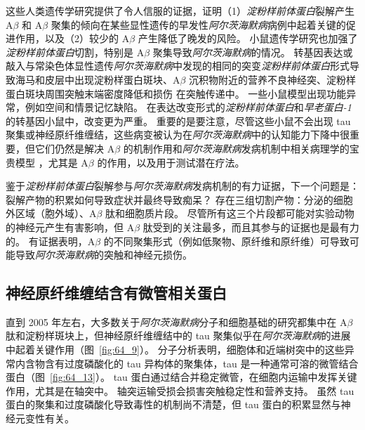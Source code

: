 这些人类遗传学研究提供了令人信服的证据，证明（1）\textit{淀粉样前体蛋白}裂解产生 A$\beta$ 和 A$\beta$ 聚集的倾向在某些显性遗传的早发性\textit{阿尔茨海默病}病例中起着关键的促进作用，以及（2）较少的 A$\beta$ 产生降低了晚发的风险。
小鼠遗传学研究也加强了\textit{淀粉样前体蛋白}切割，特别是 A$\beta$ 聚集导致\textit{阿尔茨海默病}的情况。
转基因表达或敲入与常染色体显性遗传\textit{阿尔茨海默病}中发现的相同的突变\textit{淀粉样前体蛋白}形式导致海马和皮层中出现淀粉样蛋白斑块、A$\beta$ 沉积物附近的营养不良神经突、淀粉样蛋白斑块周围突触末端密度降低和损伤 在突触传递中。
一些小鼠模型出现功能异常，例如空间和情景记忆缺陷。
在表达改变形式的\textit{淀粉样前体蛋白}和\textit{早老蛋白-1}的转基因小鼠中，改变更为严重。
重要的是要注意，尽管这些小鼠不会出现 tau 聚集或神经原纤维缠结，这些病变被认为在\textit{阿尔茨海默病}中的认知能力下降中很重要，但它们仍然是解决 A$\beta$ 的机制作用和\textit{阿尔茨海默病}发病机制中相关病理学的宝贵模型 ，尤其是 A$\beta$ 的作用，以及用于测试潜在疗法。


鉴于\textit{淀粉样前体蛋白}裂解参与\textit{阿尔茨海默病}发病机制的有力证据，下一个问题是：
裂解产物的积累如何导致症状并最终导致痴呆？
存在三组切割产物：分泌的细胞外区域（胞外域）、A$\beta$ 肽和细胞质片段。
尽管所有这三个片段都可能对实验动物的神经元产生有害影响，但 A$\beta$ 肽受到的关注最多，而且其参与的证据也是最有力的。
有证据表明，A$\beta$ 的不同聚集形式（例如低聚物、原纤维和原纤维）可导致可能导致\textit{阿尔茨海默病}的突触和神经元损伤。



\subsection{神经原纤维缠结含有微管相关蛋白}

直到 2005 年左右，大多数关于\textit{阿尔茨海默病}分子和细胞基础的研究都集中在 A$\beta$ 肽和淀粉样斑块上，但神经原纤维缠结中的 tau 聚集似乎在\textit{阿尔茨海默病}的进展中起着关键作用（图~\ref{fig:64_9}）。
分子分析表明，细胞体和近端树突中的这些异常内含物含有过度磷酸化的 tau 异构体的聚集体，tau 是一种通常可溶的微管结合蛋白（图~\ref{fig:64_13}）。
tau 蛋白通过结合并稳定微管，在细胞内运输中发挥关键作用，尤其是在轴突中。
轴突运输受损会损害突触稳定性和营养支持。
虽然 tau 蛋白的聚集和过度磷酸化导致毒性的机制尚不清楚，但 tau 蛋白的积累显然与神经元变性有关。


